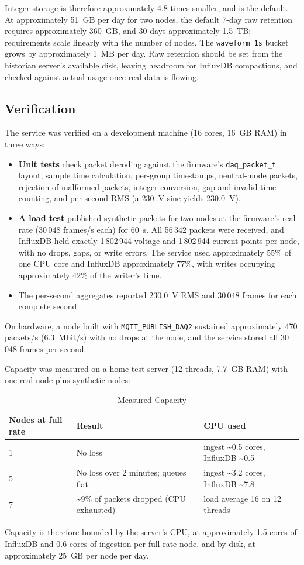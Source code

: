 Integer storage is therefore approximately 4.8 times smaller, and is the default. At approximately 51~GB per day for two nodes, the default 7-day raw retention requires approximately 360~GB, and 30 days approximately 1.5~TB; requirements scale linearly with the number of nodes. The \texttt{waveform\_1s} bucket grows by approximately 1~MB per day. Raw retention should be set from the historian server's available disk, leaving headroom for InfluxDB compactions, and checked against actual usage once real data is flowing.

\subsection{Verification}
The service was verified on a development machine (16 cores, 16~GB RAM) in three ways:
\begin{itemize}[noitemsep]
  \item \textbf{Unit tests} check packet decoding against the firmware's \texttt{daq\_packet\_t} layout, sample time calculation, per-group timestamps, neutral-mode packets, rejection of malformed packets, integer conversion, gap and invalid-time counting, and per-second RMS (a 230~V sine yields 230.0~V).
  \item \textbf{A load test} published synthetic packets for two nodes at the firmware's real rate (30\,048 frames/s each) for 60~s. All 56\,342 packets were received, and InfluxDB held exactly 1\,802\,944 voltage and 1\,802\,944 current points per node, with no drops, gaps, or write errors. The service used approximately 55\% of one CPU core and InfluxDB approximately 77\%, with writes occupying approximately 42\% of the writer's time.
  \item The per-second aggregates reported 230.0~V RMS and 30\,048 frames for each complete second.
\end{itemize}
On hardware, a node built with \texttt{MQTT\_PUBLISH\_DAQ2} sustained approximately 470 packets/s (6.3~Mbit/s) with no drops at the node, and the service stored all 30\,048 frames per second.

Capacity was measured on a home test server (12 threads, 7.7~GB RAM) with one real node plus synthetic nodes:
\begin{table}[H]
\centering
\caption{Measured Capacity}
\begin{tabular}{lll}
\hline
\textbf{Nodes at full rate} & \textbf{Result} & \textbf{CPU used} \\
\hline
1 & No loss & ingest \textasciitilde 0.5 cores, InfluxDB \textasciitilde 0.5 \\
5 & No loss over 2 minutes; queues flat & ingest \textasciitilde 3.2 cores, InfluxDB \textasciitilde 7.8 \\
7 & \textasciitilde 9\% of packets dropped (CPU exhausted) & load average 16 on 12 threads \\
\hline
\end{tabular}
\end{table}
Capacity is therefore bounded by the server's CPU, at approximately 1.5 cores of InfluxDB and 0.6 cores of ingestion per full-rate node, and by disk, at approximately 25~GB per node per day.
